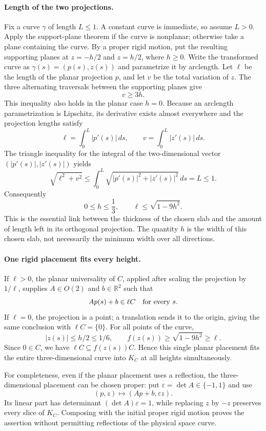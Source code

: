 \paragraph{Length of the two projections.}
Fix a curve $\gamma$ of length $L\le1$. A constant curve is immediate, so
assume $L>0$. Apply the support-plane theorem if the curve is nonplanar;
otherwise take a plane containing the curve. By a proper rigid motion,
put the resulting supporting planes at $z=-h/2$ and $z=h/2$, where $h\ge0$.
Write the transformed curve as $\gamma(s)=(p(s),z(s))$ and parametrize it
by arclength. Let $\ell$ be the length of the planar projection $p$, and
let $v$ be the total variation of $z$. The three alternating traversals
between the supporting planes give
\[
 v\ge3h.
\]
This inequality also holds in the planar case $h=0$.
Because an arclength parametrization is Lipschitz, its derivative exists
almost everywhere and the projection lengths satisfy
\[
 \ell=\int_0^L |p'(s)|\,ds,\qquad
 v=\int_0^L |z'(s)|\,ds.
\]
The triangle inequality for the integral of the two-dimensional vector
$(|p'(s)|,|z'(s)|)$ yields
\[
 \sqrt{\ell^2+v^2}
 \le \int_0^L\sqrt{|p'(s)|^2+|z'(s)|^2}\,ds=L\le1.
\]
Consequently
\[
 0\le h\le\frac13,
 \qquad \ell\le\sqrt{1-9h^2}.
\]
This is the essential link between the thickness of the chosen slab and
the amount of length left in its orthogonal projection. The quantity $h$
is the width of this chosen slab, not necessarily the minimum width over
all directions.

\paragraph{One rigid placement fits every height.}
If $\ell>0$, the planar universality of $C$, applied after scaling the
projection by $1/\ell$, supplies $A\in O(2)$ and $b\in\mathbb R^2$ such that
\[
 A p(s)+b\in\ell C\quad\hbox{for every }s.
\]
If $\ell=0$, the projection is a point; a translation sends it to the
origin, giving the same conclusion with $\ell C=\{0\}$.
For all points of the curve,
\[
 |z(s)|\le h/2\le1/6,
 \qquad
 f(z(s))\ge\sqrt{1-9h^2}\ge\ell.
\]
Since $0\in C$, we have $\ell C\subseteq f(z(s))C$. Hence this single
planar placement fits the entire three-dimensional curve into $K_C$ at
all heights simultaneously.

For completeness, even if the planar placement uses a reflection, the
three-dimensional placement can be chosen proper: put
$\varepsilon=\det A\in\{-1,1\}$ and use
\[
 (p,z)\longmapsto(Ap+b,\varepsilon z).
\]
Its linear part has determinant $(\det A)\varepsilon=1$, while replacing
$z$ by $-z$ preserves every slice of $K_C$. Composing with the initial
proper rigid motion proves the assertion without permitting reflections
of the physical space curve.

